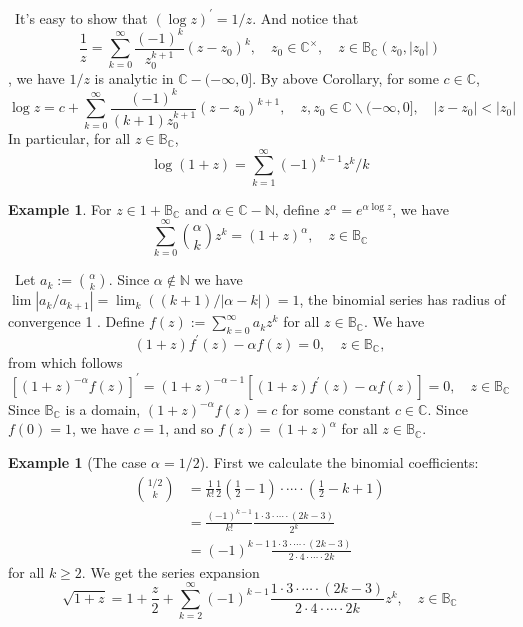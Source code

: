 \documentclass[12pt,a4paper]{book}
\newenvironment{prooff}{{\noindent\it\textcolor{cyan!40!black}{Proof}:}\,}{\par}
\newcommand{\bb}[1]{\mathbb{#1}}
\newcommand{\p}{^{\prime}}
\theoremstyle{definition}
\newtheorem{exam}[defn]{Example}
\begin{document}
\begin{prooff}
   It's easy to show that $(\log z)\p=1/z$. 
   And notice that 
   $$
   \frac{1}{z}=\sum_{k=0}^{\infty} \frac{(-1)^k}{z_0^{k+1}}\left(z-z_0\right)^k, \quad z_0 \in \mathbb{C}^{\times}, \quad z \in \mathbb{B}_{\mathbb{C}}\left(z_0,\left|z_0\right|\right)
   $$, 
we have $1/z$ is analytic in $\bb{C}-(-\infty,0]$. By above Corollary, for some $c\in \bb{C}$, 
$$
\log z=c+\sum_{k=0}^{\infty} \frac{(-1)^k}{(k+1) z_0^{k+1}}\left(z-z_0\right)^{k+1}, \quad z, z_0 \in \mathbb{C} \backslash(-\infty, 0], \quad\left|z-z_0\right|<\left|z_0\right|
$$
In particular, for all $z \in \mathbb{B}_{\mathbb{C}}$,
$$
\log (1+z)=\sum_{k=1}^{\infty}(-1)^{k-1} z^k / k
$$


\end{prooff}
\begin{exam}
For $z\in 1+\bb{B}_\bb{C}$ and $\alpha\in \bb{C}-\bb{N}$, 
define $z^\alpha=e^{\alpha\log z}$, we have 
$$
\sum_{k=0}^{\infty}\binom{\alpha}{k} z^k=(1+z)^\alpha, \quad z \in \mathbb{B}_{\mathbb{C}}
$$
\end{exam}
\begin{prooff}
    Let $a_k:=\binom{\alpha}{k}$. Since $\alpha \notin \mathbb{N}$ we have $\lim \left|a_k / a_{k+1}\right|=\lim _k((k+1) /|\alpha-k|)=1$, the binomial series has radius of convergence 1 .
Define $f(z):=\sum_{k=0}^{\infty} a_k z^k$ for all $z \in \mathbb{B}_{\mathbb{C}}$. We have
$$
(1+z) f^{\prime}(z)-\alpha f(z)=0, \quad z \in \mathbb{B}_{\mathbb{C}},
$$
from which follows
$$
\left[(1+z)^{-\alpha} f(z)\right]^{\prime}=(1+z)^{-\alpha-1}\left[(1+z) f^{\prime}(z)-\alpha f(z)\right]=0, \quad z \in \mathbb{B}_{\mathbb{C}}
$$
Since $\mathbb{B}_{\mathbb{C}}$ is a domain, $(1+z)^{-\alpha} f(z)=c$ for some constant $c \in \mathbb{C}$. Since $f(0)=1$, we have $c=1$, and so $f(z)=(1+z)^\alpha$ for all $z \in \mathbb{B}_{\mathbb{C}}$.
\end{prooff}
\begin{exam}[The case $\alpha=1 / 2$]
    First we calculate the binomial coefficients:
    $$
    \begin{aligned}
    \binom{1 / 2}{k} & =\frac{1}{k!} \frac{1}{2}\left(\frac{1}{2}-1\right) \cdot \cdots \cdot\left(\frac{1}{2}-k+1\right) \\
    & =\frac{(-1)^{k-1}}{k!} \frac{1 \cdot 3 \cdot \cdots \cdot(2 k-3)}{2^k} \\
    & =(-1)^{k-1} \frac{1 \cdot 3 \cdot \cdots \cdot(2 k-3)}{2 \cdot 4 \cdot \cdots \cdot 2 k}
    \end{aligned}
    $$
    for all $k \geq 2$. We get the series expansion
    $$
    \sqrt{1+z}=1+\frac{z}{2}+\sum_{k=2}^{\infty}(-1)^{k-1} \frac{1 \cdot 3 \cdot \cdots \cdot(2 k-3)}{2 \cdot 4 \cdot \cdots \cdot 2 k} z^k, \quad z \in \mathbb{B}_{\mathbb{C}}
    $$   
\end{exam}
\end{document}
